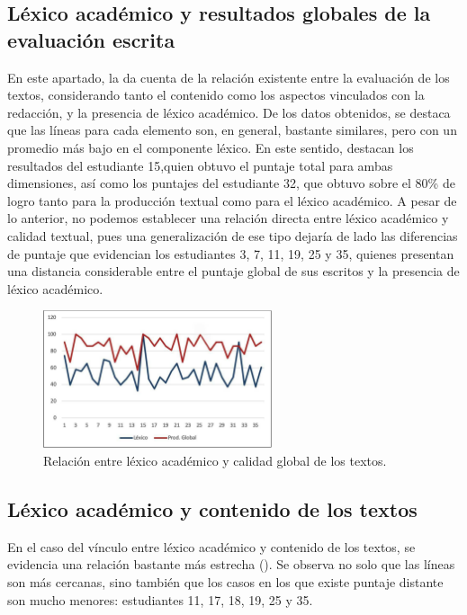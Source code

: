 \documentclass{textolivre}
\begin{document}
\subsection{Léxico académico y resultados globales de la evaluación escrita}\label{sec-lex-aca-res}
En este apartado, la  da cuenta de la relación existente entre la
evaluación de los textos, considerando tanto el contenido como los aspectos
vinculados con la redacción, y la presencia de léxico académico. De los datos
obtenidos, se destaca que las líneas para cada elemento son, en general,
bastante similares, pero con un promedio más bajo en el componente léxico. En
este sentido, destacan los resultados del estudiante 15,quien obtuvo el puntaje
total para ambas dimensiones, así como los puntajes del estudiante 32, que
obtuvo sobre el 80\% de logro tanto para la producción textual como para el
léxico académico. A pesar de lo anterior, no podemos establecer una
relación directa entre léxico académico y calidad textual, pues una
generalización de ese tipo dejaría de lado las diferencias de puntaje que
evidencian los estudiantes 3, 7, 11, 19, 25 y 35, quienes presentan una
distancia considerable entre el puntaje global de sus escritos y la presencia de
léxico académico.

\begin{figure}[htbp]
 \centering
 \includegraphics[width=0.6\textwidth]{figure02.pdf}
 \caption{Relación entre léxico académico y calidad global de los textos.}
 \label{fig02}
\end{figure}


\subsection{Léxico académico y contenido de los textos}\label{sec-contenido}
En el caso del vínculo entre léxico académico y contenido de los textos,
se evidencia una relación bastante más estrecha (). Se observa no solo
que las líneas son más cercanas, sino también que los casos en los que existe
puntaje distante son mucho menores: estudiantes 11, 17, 18, 19, 25 y 35.
\end{document}
